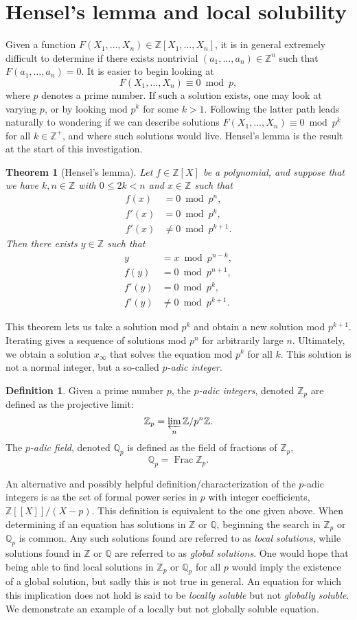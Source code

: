 \documentclass[12pt,twoside]{reedthesis}
\theoremstyle{plain}
\newtheorem{theorem}{Theorem}[chapter]
\theoremstyle{definition}
\newtheorem{definition}{Definition}[section]
\theoremstyle{remark}
\newcommand{\ZZ}{\mathbb{Z}}
\newcommand{\QQ}{\mathbb{Q}}
\newcommand{\Frac}{\operatorname{Frac}}
\begin{document}
\section{Hensel's lemma and local solubility}
Given a function $F(X_1,\ldots,X_n)\in\ZZ[X_1,\ldots,X_n]$, it is in general extremely difficult to determine if there exists nontrivial $(a_1,\ldots,a_n)\in\ZZ^n$ such that $F(a_1,\ldots,a_n)=0$. It is easier to begin looking at \[F(X_1,\ldots,X_n)\equiv0\bmod p,\] where $p$ denotes a prime number. If such a solution exists, one may look at varying $p$, or by looking mod $p^k$ for some $k>1$. Following the latter path leads naturally to wondering if we can describe solutions $F(X_1,\ldots,X_n)\equiv0\bmod p^k$ for all $k\in\ZZ^+$, and where such solutions would live. Hensel's lemma is the result at the start of this investigation.
\begin{theorem}[Hensel's lemma]
Let $f\in\ZZ[X]$ be a polynomial, and suppose that we have $k,n\in\ZZ$ with $0\leq2k<n$ and $x\in\ZZ$ such that
\begin{align*}
f(x)&=0\bmod p^n,\\
f'(x)&=0\bmod p^k,\\
f'(x)&\neq0\bmod p^{k+1}.
\end{align*}
Then there exists $y\in\ZZ$ such that 
\begin{align*}
y&=x\bmod p^{n-k},\\ f(y)&=0\bmod p^{n+1},\\ 
f'(y)&=0\bmod p^k,\\ f'(y)&\neq0\bmod p^{k+1}.
\end{align*}
\end{theorem}
This theorem lets us take a solution mod $p^k$ and obtain a new solution mod $p^{k+1}$. Iterating gives a sequence of solutions mod $p^n$ for arbitrarily large $n$. Ultimately, we obtain a solution $x_\infty$ that solves the equation mod $p^k$ for all $k$. This solution is not a normal integer, but a so-called \emph{$p$-adic integer}.
\begin{definition}
Given a prime number $p$, the \emph{$p$-adic integers}, denoted $\ZZ_p$ are defined as the projective limit:\[\ZZ_p=\varprojlim_n\ZZ/p^n\ZZ.\] The \emph{$p$-adic field}, denoted $\QQ_p$ is defined as the field of fractions of $\ZZ_p$, \[\QQ_p=\Frac\ZZ_p.\]
\end{definition} 
An alternative and possibly helpful definition/characterization of the $p$-adic integers is as the set of formal power series in $p$ with integer coefficients, $\ZZ[[X]]/(X-p)$. This definition is equivalent to the one given above. 
When determining if an equation has solutions in $\ZZ$ or $\QQ$, beginning the search in $\ZZ_p$ or $\QQ_p$ is common. Any such solutions found are referred to as \emph{local solutions}, while solutions found in $\ZZ$ or $\QQ$ are referred to as \emph{global solutions}. One would hope that being able to find local solutions in $\ZZ_p$ or $\QQ_p$ for all $p$ would imply the existence of a global solution, but sadly this is not true in general. An equation for which this implication does not hold is said to be \emph{locally soluble} but not \emph{globally soluble}. We demonstrate an example of a locally but not globally soluble equation.
\end{document}
